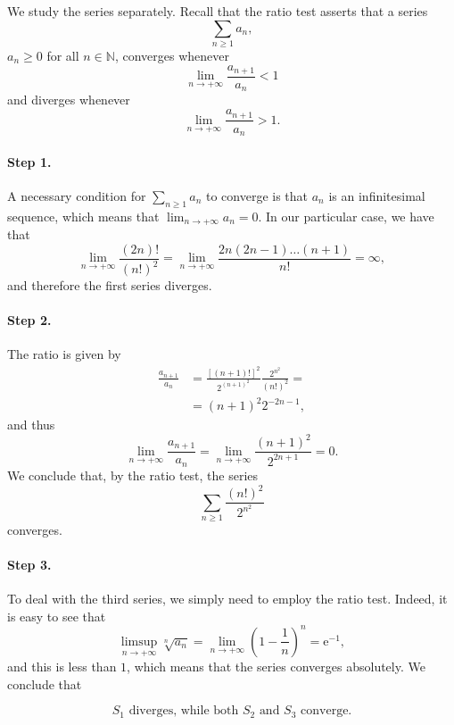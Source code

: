 \documentclass[a4paper,10 pt]{report}
\newcommand{\finalanswer}[1]{%
    \begin{finalAnswer}
    \[
        #1
    \]
    \end{finalAnswer}
}
\theoremstyle{definition}
\newcommand{\N}{\mathbb N}
\begin{document}
\begin{solutionBox} We study the series separately. Recall that the ratio test asserts that a series
\begin{equation*}\sum_{n \geq 1} a_n,\end{equation*}
$a_n \geq 0$ for all $n \in \N$, converges whenever
\begin{equation*}\lim_{n \to + \infty} \frac{a_{n + 1}}{a_n} < 1\end{equation*}
and diverges whenever
\begin{equation*}\lim_{n \to + \infty} \frac{a_{n + 1}}{a_n} > 1.\end{equation*}

\paragraph{Step 1.} A necessary condition for $\sum_{n \geq 1} a_n$ to converge is that $a_n$ is an infinitesimal sequence, which means that $\lim_{n\to + \infty} a_n = 0$. In our particular case, we have that
\begin{equation*} \lim_{n \to + \infty} \frac{(2n)!}{(n!)^2} = \lim_{n \to + \infty} \frac{ 2n(2n - 1) \dots (n + 1) }{n!} = \infty, \end{equation*}
and therefore the first series diverges.

\paragraph{Step 2.} The ratio is given by
\begin{equation*}\begin{aligned} \frac{a_{n + 1}}{a_n} & = \frac{[(n + 1)!]^2}{2^{(n + 1)^2}} \frac{2^{n^2}}{(n!)^2} =
\\[1em] & = (n + 1)^2 2^{- 2n - 1},
\end{aligned} \end{equation*}
and thus
\begin{equation*}\lim_{n \to + \infty} \frac{a_{n + 1}}{a_n} = \lim_{n \to + \infty} \frac{(n+1)^2}{2^{2n + 1}} = 0.\end{equation*}
We conclude that, by the ratio test, the series 
\begin{equation*} \sum_{n \geq 1} \frac{(n!)^2}{2^{n^2}}\end{equation*}
converges.

\paragraph{Step 3.} To deal with the third series, we simply need to employ the ratio test. Indeed, it is easy to see that
\begin{equation*} \limsup_{n \to + \infty} \sqrt[n]{a_n} = \lim_{n \to + \infty} \left( 1 - \frac{1}{n} \right)^{n} = \mathrm{e}^{-1}, \end{equation*}
and this is less than $1$, which means that the series converges absolutely. We conclude that
\finalanswer{
\text{$S_1$ diverges, while both $S_2$ and $S_3$ converge}.
}\end{solutionBox}
\end{document}
